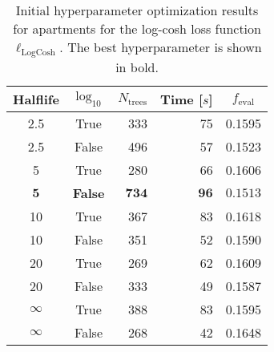 \begin{table}[h!]
  \begin{tabular}{@{}ccrrc@{}}
    Halflife & $\log_{10}$ & $N_\mathrm{trees}$ & Time [$s$] & $f_\mathrm{eval}$ \\
    \midrule
    \num{2.5} & True & \num{333} & \num{75} & \num{0.1595} \\
    \num{2.5} & False & \num{496} & \num{57} & \num{0.1523} \\
    \num{5} & True & \num{280} & \num{66} & \num{0.1606} \\
    $\mathbf{5}$ & \textbf{False} & $\mathbf{734}$ & $\mathbf{96}$ & $\mathbf{0.1513}$ \\
    \num{10} & True & \num{367} & \num{83} & \num{0.1618} \\
    \num{10} & False & \num{351} & \num{52} & \num{0.1590} \\
    \num{20} & True & \num{269} & \num{62} & \num{0.1609} \\
    \num{20} & False & \num{333} & \num{49} & \num{0.1587} \\
    $\infty$ & True & \num{388} & \num{83} & \num{0.1595} \\
    $\infty$ & False & \num{268} & \num{42} & \num{0.1648} \\
  \end{tabular}
  \caption[Initial Hyperparameter Optimization Results for Apartments -- Log-Cosh Loss Function]{\label{tab:h:HPO_initial_Logcosh-ejerlejlighed-appendix}Initial hyperparameter optimization results for apartments for the log-cosh loss function $\ell_\mathrm{LogCosh}$. The best hyperparameter is shown in bold.}
\end{table}



